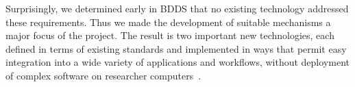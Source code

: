 \documentclass[11pt]{article}
\begin{document}

Surprisingly, we determined early in BDDS that no existing technology addressed these requirements.
Thus we made the development of suitable mechanisms a major focus of the project.
The result is two important new technologies, each defined in terms of existing standards and
implemented in ways that permit easy integration into a wide variety of
applications and workflows, without deployment of complex software on researcher computers~\cite{chard16}.
\end{document}

